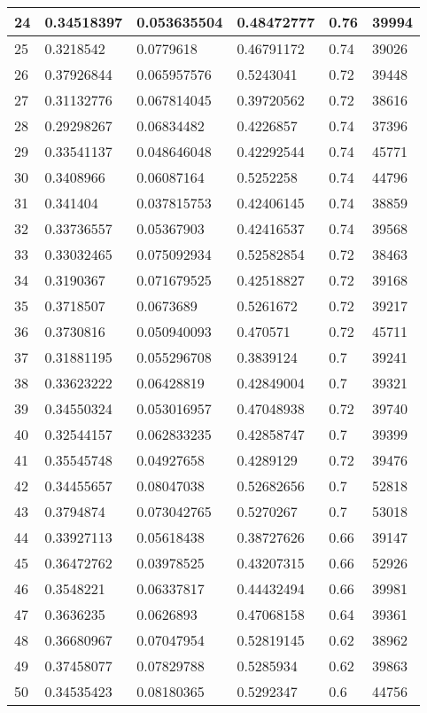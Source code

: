\begin{longtable}{|l|l|l|l|l|l|}
24 & 0.34518397 & 0.053635504 & 0.48472777 & 0.76 & 39994 \\ \hline 
25 & 0.3218542 & 0.0779618 & 0.46791172 & 0.74 & 39026 \\ \hline 
26 & 0.37926844 & 0.065957576 & 0.5243041 & 0.72 & 39448 \\ \hline 
27 & 0.31132776 & 0.067814045 & 0.39720562 & 0.72 & 38616 \\ \hline 
28 & 0.29298267 & 0.06834482 & 0.4226857 & 0.74 & 37396 \\ \hline 
29 & 0.33541137 & 0.048646048 & 0.42292544 & 0.74 & 45771 \\ \hline 
30 & 0.3408966 & 0.06087164 & 0.5252258 & 0.74 & 44796 \\ \hline 
31 & 0.341404 & 0.037815753 & 0.42406145 & 0.74 & 38859 \\ \hline 
32 & 0.33736557 & 0.05367903 & 0.42416537 & 0.74 & 39568 \\ \hline 
33 & 0.33032465 & 0.075092934 & 0.52582854 & 0.72 & 38463 \\ \hline 
34 & 0.3190367 & 0.071679525 & 0.42518827 & 0.72 & 39168 \\ \hline 
35 & 0.3718507 & 0.0673689 & 0.5261672 & 0.72 & 39217 \\ \hline 
36 & 0.3730816 & 0.050940093 & 0.470571 & 0.72 & 45711 \\ \hline 
37 & 0.31881195 & 0.055296708 & 0.3839124 & 0.7 & 39241 \\ \hline 
38 & 0.33623222 & 0.06428819 & 0.42849004 & 0.7 & 39321 \\ \hline 
39 & 0.34550324 & 0.053016957 & 0.47048938 & 0.72 & 39740 \\ \hline 
40 & 0.32544157 & 0.062833235 & 0.42858747 & 0.7 & 39399 \\ \hline 
41 & 0.35545748 & 0.04927658 & 0.4289129 & 0.72 & 39476 \\ \hline 
42 & 0.34455657 & 0.08047038 & 0.52682656 & 0.7 & 52818 \\ \hline 
43 & 0.3794874 & 0.073042765 & 0.5270267 & 0.7 & 53018 \\ \hline 
44 & 0.33927113 & 0.05618438 & 0.38727626 & 0.66 & 39147 \\ \hline 
45 & 0.36472762 & 0.03978525 & 0.43207315 & 0.66 & 52926 \\ \hline 
46 & 0.3548221 & 0.06337817 & 0.44432494 & 0.66 & 39981 \\ \hline 
47 & 0.3636235 & 0.0626893 & 0.47068158 & 0.64 & 39361 \\ \hline 
48 & 0.36680967 & 0.07047954 & 0.52819145 & 0.62 & 38962 \\ \hline 
49 & 0.37458077 & 0.07829788 & 0.5285934 & 0.62 & 39863 \\ \hline 
50 & 0.34535423 & 0.08180365 & 0.5292347 & 0.6 & 44756 \\ \hline 
\end{longtable}